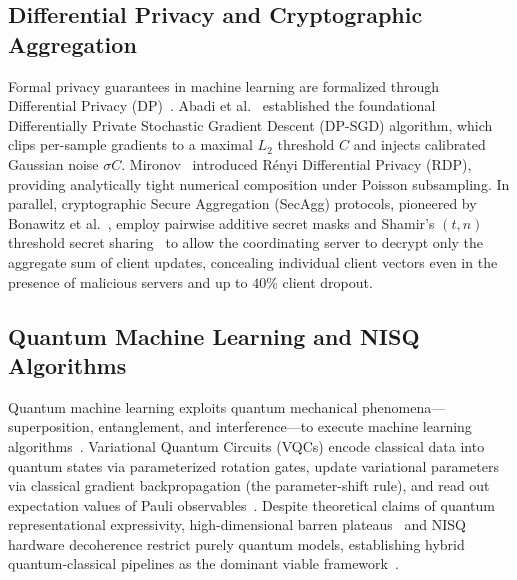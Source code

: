 \documentclass[conference]{IEEEtran}
\begin{document}
\subsection{Differential Privacy and Cryptographic Aggregation}
Formal privacy guarantees in machine learning are formalized through Differential Privacy (DP)~\cite{dwork2006calibrating}. Abadi et al.~\cite{abadi2016deep} established the foundational Differentially Private Stochastic Gradient Descent (\textsf{DP-SGD}) algorithm, which clips per-sample gradients to a maximal $L_2$ threshold $C$ and injects calibrated Gaussian noise $\sigma C$. Mironov~\cite{mironov2017renyi} introduced Rényi Differential Privacy (RDP), providing analytically tight numerical composition under Poisson subsampling. In parallel, cryptographic Secure Aggregation (\textsf{SecAgg}) protocols, pioneered by Bonawitz et al.~\cite{bonawitz2017practical}, employ pairwise additive secret masks and Shamir's $(t, n)$ threshold secret sharing~\cite{shamir1979share} to allow the coordinating server to decrypt only the aggregate sum of client updates, concealing individual client vectors even in the presence of malicious servers and up to $40\%$ client dropout.

\subsection{Quantum Machine Learning and NISQ Algorithms}
Quantum machine learning exploits quantum mechanical phenomena---superposition, entanglement, and interference---to execute machine learning algorithms~\cite{biamonte2017quantum,cerezo2021variational}. Variational Quantum Circuits (VQCs) encode classical data into quantum states via parameterized rotation gates, update variational parameters via classical gradient backpropagation (the parameter-shift rule), and read out expectation values of Pauli observables~\cite{bergholm2018pennylane,shuld2019evaluating}. Despite theoretical claims of quantum representational expressivity, high-dimensional barren plateaus~\cite{mcclean2018barren} and NISQ hardware decoherence restrict purely quantum models, establishing hybrid quantum-classical pipelines as the dominant viable framework~\cite{chen2021federated}.
\end{document}
